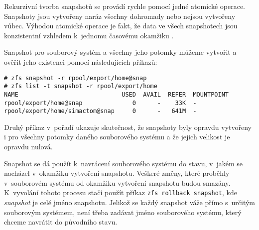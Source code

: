 Rekurzivní tvorba snapshotů se provádí rychle pomocí jedné atomické operace. Snapshoty jsou vytvořeny naráz všechny dohromady nebo nejsou vytvořeny vůbec. Výhodou atomické operace je fakt, že data ve všech snapshotech jsou konzistentní vzhledem k~jednomu časovému okamžiku \cite{snapshot}.

Snapshot pro souborový systém a všechny jeho potomky můžeme vytvořit a ověřit jeho existenci pomocí následujících příkazů:
\begin{verbatim}
# zfs snapshot -r rpool/export/home@snap
# zfs list -t snapshot -r rpool/export/home
NAME                             USED  AVAIL  REFER  MOUNTPOINT
rpool/export/home@snap              0      -    33K  -
rpool/export/home/simactom@snap     0      -   641M  -
\end{verbatim}
Druhý příkaz v~pořadí ukazuje skutečnost, že snapshoty byly opravdu vytvořeny i pro všechny potomky daného souborového systému a že jejich velikost je opravdu nulová.

Snapshot se dá použít k~navrácení souborového systému do stavu, v~jakém se nacházel v~okamžiku vytvoření snapshotu. Veškeré změny, které proběhly v~souborovém systému od okamžiku vytvoření snapshotu budou smazány. K~vyvolání tohoto procesu stačí použít příkaz \verb|zfs rollback snapshot|, kde \emph{snapshot} je celé jméno snapshotu. Jelikož se každý snapshot váže přímo s~určitým souborovým systémem, není třeba zadávat jméno souborového systému, který chceme navrátit do původního stavu. 